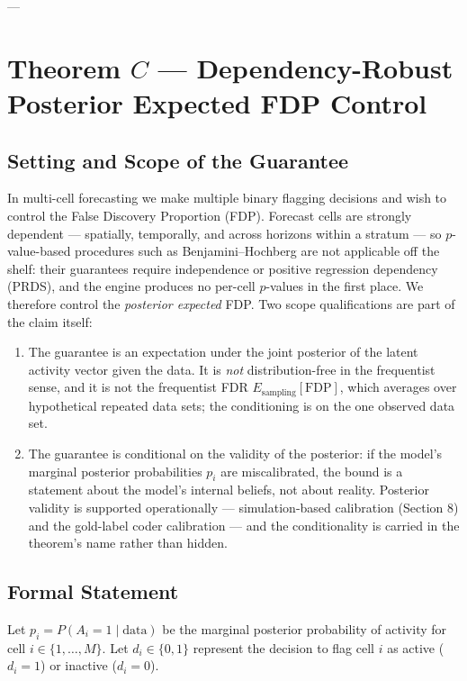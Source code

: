 \documentclass[11pt,a4paper]{article}
\begin{document}
---

\section{Theorem $C$ --- Dependency-Robust Posterior Expected FDP Control}

\subsection{Setting and Scope of the Guarantee}
In multi-cell forecasting we make multiple binary flagging decisions and wish to control the False Discovery Proportion (FDP). Forecast cells are strongly dependent --- spatially, temporally, and across horizons within a stratum --- so $p$-value-based procedures such as Benjamini--Hochberg are not applicable off the shelf: their guarantees require independence or positive regression dependency (PRDS), and the engine produces no per-cell $p$-values in the first place. We therefore control the \emph{posterior expected} FDP. Two scope qualifications are part of the claim itself: %
\begin{enumerate}
    \item The guarantee is an expectation under the joint posterior of the latent activity vector given the data. It is \emph{not} distribution-free in the frequentist sense, and it is not the frequentist FDR $E_{\text{sampling}}[\mathrm{FDP}]$, which averages over hypothetical repeated data sets; the conditioning is on the one observed data set. %
    \item The guarantee is conditional on the validity of the posterior: if the model's marginal posterior probabilities $p_i$ are miscalibrated, the bound is a statement about the model's internal beliefs, not about reality. Posterior validity is supported operationally --- simulation-based calibration (Section 8) and the gold-label coder calibration --- and the conditionality is carried in the theorem's name rather than hidden. %
\end{enumerate}

\subsection{Formal Statement}
Let $p_i = P(A_i = 1 \mid \text{data})$ be the marginal posterior probability of activity for cell $i \in \{1, \dots, M\}$. Let $d_i \in \{0, 1\}$ represent the decision to flag cell $i$ as active ($d_i=1$) or inactive ($d_i=0$).
\end{document}

